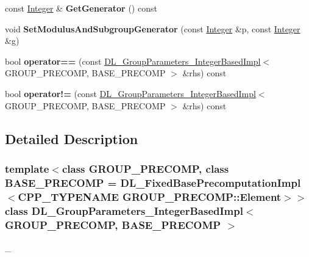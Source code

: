 \begin{DoxyCompactItemize}
\item 
\hypertarget{class_d_l___group_parameters___integer_based_impl_a1deb250199598ed6ae3045d4c372f762}{
const \hyperlink{class_integer}{Integer} \& {\bfseries GetGenerator} () const }
\label{class_d_l___group_parameters___integer_based_impl_a1deb250199598ed6ae3045d4c372f762}

\item 
\hypertarget{class_d_l___group_parameters___integer_based_impl_a42ef80eabc3ef9d5735f97447b6c765c}{
void {\bfseries SetModulusAndSubgroupGenerator} (const \hyperlink{class_integer}{Integer} \&p, const \hyperlink{class_integer}{Integer} \&g)}
\label{class_d_l___group_parameters___integer_based_impl_a42ef80eabc3ef9d5735f97447b6c765c}

\item 
\hypertarget{class_d_l___group_parameters___integer_based_impl_ab7edd90ec71ac08615204b9b952bf72f}{
bool {\bfseries operator==} (const \hyperlink{class_d_l___group_parameters___integer_based_impl}{DL\_\-GroupParameters\_\-IntegerBasedImpl}$<$ GROUP\_\-PRECOMP, BASE\_\-PRECOMP $>$ \&rhs) const }
\label{class_d_l___group_parameters___integer_based_impl_ab7edd90ec71ac08615204b9b952bf72f}

\item 
\hypertarget{class_d_l___group_parameters___integer_based_impl_a205bcf9ef811624a1755f356575b6edb}{
bool {\bfseries operator!=} (const \hyperlink{class_d_l___group_parameters___integer_based_impl}{DL\_\-GroupParameters\_\-IntegerBasedImpl}$<$ GROUP\_\-PRECOMP, BASE\_\-PRECOMP $>$ \&rhs) const }
\label{class_d_l___group_parameters___integer_based_impl_a205bcf9ef811624a1755f356575b6edb}

\end{DoxyCompactItemize}


\subsection{Detailed Description}
\subsubsection*{template$<$class GROUP\_\-PRECOMP, class BASE\_\-PRECOMP = DL\_\-FixedBasePrecomputationImpl$<$CPP\_\-TYPENAME GROUP\_\-PRECOMP::Element$>$$>$ class DL\_\-GroupParameters\_\-IntegerBasedImpl$<$ GROUP\_\-PRECOMP, BASE\_\-PRECOMP $>$}

\_\- 

